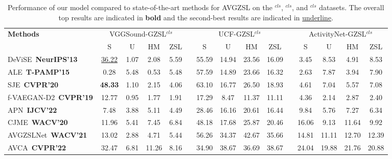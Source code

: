 \documentclass[lettersize,journal]{IEEEtran}
\begin{document}
\newlength{\oldaboverulesep}
\newlength{\oldbelowrulesep}
\begin{table}[!t]
  \centering
  \caption{Performance of our model compared to state-of-the-art methods for AVGZSL on the $^{\textit{cls}}$, $^{\textit{cls}}$, and $^{\textit{cls}}$ datasets. The overall top results are indicated in \textbf{bold} and the second-best results are indicated in \underline{underline}.}
  \label{tab:sota}
  
  \begin{tabular}{l cccc c cccc c cccc}
    \toprule[2pt]
    \multirow{2}{*}{\textbf{Methods}} 
    & \multicolumn{4}{c}{VGGSound-GZSL$^{\textit{cls}}$} & & \multicolumn{4}{c}{UCF-GZSL$^{\textit{cls}}$} & & \multicolumn{4}{c}{ActivityNet-GZSL$^{\textit{cls}}$} \\
    \cmidrule(lr){2-5} \cmidrule(lr){7-10} \cmidrule(lr){12-15}
    & S & U & HM & ZSL & & S & U & HM & ZSL & & S & U & HM & ZSL \\
    \midrule[1pt]
    DeViSE \cite{38} \,{\scriptsize \textbf{NeurIPS'13}} & \underline{36.22} & 1.07 & 2.08 & 5.59 & & 55.59 & 14.94 & 23.56 & 16.09 & & 3.45 & 8.53 & 4.91 & 8.53 \\
    ALE \cite{39} \,{\scriptsize \textbf{T-PAMP'15}} & 0.28 & 5.48 & 0.53 & 5.48 & & 57.59 & 14.89 & 23.66 & 16.32 & & 2.63 & 7.87 & 3.94 & 7.90 \\
    SJE \cite{40} \,{\scriptsize \textbf{CVPR'20}} & \textbf{48.33} & 1.10 & 2.15 & 4.06 & & 63.10 & 16.77 & 26.50 & 18.93 & & 4.61 & 7.04 & 5.57 & 7.08 \\
    f-VAEGAN-D2 \cite{42} \,{\scriptsize \textbf{CVPR'19}} & 12.77 & 0.95 & 1.77 & 1.91 & & 17.29 & 8.47 & 11.37 & 11.11 & & 4.36 & 2.14 & 2.87 & 2.40 \\
    APN \cite{41} \,{\scriptsize \textbf{IJCV'22}} & 7.48 & 3.88 & 5.11 & 4.49 & & 28.46 & 16.16 & 20.61 & 16.44 & & 9.84 & 5.76 & 7.27 & 6.34 \\
    CJME \cite{3} \,{\scriptsize \textbf{WACV'20}} & 11.96 & 5.41 & 7.45 & 6.84 & & 48.18 & 17.68 & 25.87 & 20.46 & & 16.06 & 9.13 & 11.64 & 9.92 \\
    AVGZSLNet \cite{4} \,{\scriptsize \textbf{WACV'21}} & 13.02 & 2.88 & 4.71 & 5.44 & & 56.26 & 34.37 & 42.67 & 35.66 & & 14.81 & 11.11 & 12.70 & 12.39 \\
    AVCA \cite{1} \,{\scriptsize \textbf{CVPR'22}} & 32.47 & 6.81 & 11.26 & 8.16 & & 34.90 & 38.67 & 36.69 & 38.67 & & 24.04 & 19.88 & 21.76 & 20.88 \\

\end{tabular}
\end{table}
\end{document}
